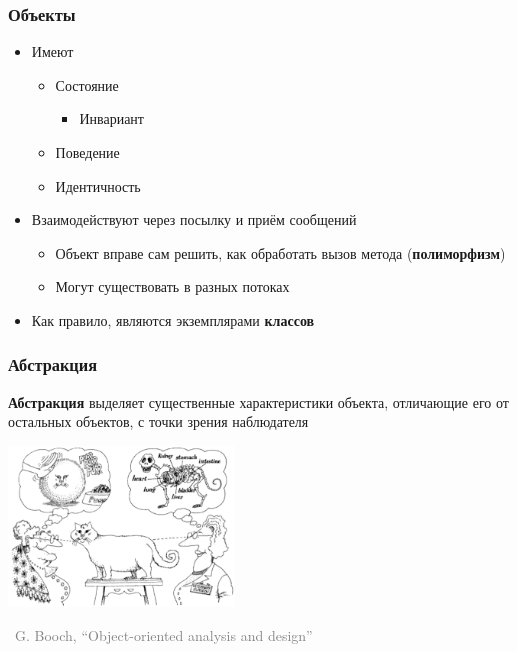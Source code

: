 \documentclass[xetex,mathserif,serif]{beamer}
\newcommand{\attribution}[1] {
    \begin{flushright}\begin{scriptsize}\textcolor{gray}{\textcopyright\, #1}\end{scriptsize}\end{flushright}
}
\begin{document}
    \begin{frame}
        \frametitle{Объекты}
        \begin{itemize}
            \item Имеют
            \begin{itemize}
                \item Состояние
                \begin{itemize}
                    \item Инвариант
                \end{itemize}
                \item Поведение
                \item Идентичность
            \end{itemize}
            \item Взаимодействуют через посылку и приём сообщений
            \begin{itemize}
                \item Объект вправе сам решить, как обработать вызов метода (\textbf{полиморфизм})
                \item Могут существовать в разных потоках
            \end{itemize}
            \item Как правило, являются экземплярами \textbf{классов}
        \end{itemize}
    \end{frame}

    \begin{frame}
        \frametitle{Абстракция}
        \textbf{Абстракция} выделяет существенные характеристики объекта, отличающие его от остальных объектов, с точки зрения наблюдателя
        \vskip 1cm
        \begin{center}
            \includegraphics[width=0.45\textwidth]{abstraction.png}
        \end{center}
        \attribution{G. Booch, ``Object-oriented analysis and design''}
    \end{frame}
\end{document}
